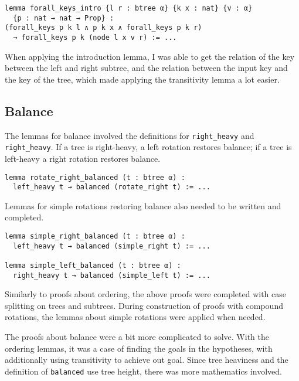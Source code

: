 \begin{lstlisting}[caption=\empty]
lemma forall_keys_intro {l r : btree α} {k x : nat} {v : α} 
  {p : nat → nat → Prop} :
(forall_keys p k l ∧ p k x ∧ forall_keys p k r) 
  → forall_keys p k (node l x v r) := ...
\end{lstlisting}

When applying the introduction lemma, I was able to get the relation of the key between the left and right subtree, and the relation between the input key and the key of the tree, which made applying the transitivity lemma a lot easier.

\subsection*{Balance}
The lemmas for balance involved the definitions for \lstinline{right_heavy} and \lstinline{right_heavy}. If a tree is right-heavy, a left rotation restores balance; if a tree is left-heavy a right rotation restores balance.

\begin{lstlisting}[caption=\empty]
lemma rotate_right_balanced (t : btree α) :
  left_heavy t → balanced (rotate_right t) := ...
\end{lstlisting}

Lemmas for simple rotations restoring balance also needed to be written and completed. 

\begin{lstlisting}[caption=\empty]
lemma simple_right_balanced (t : btree α) :
  left_heavy t → balanced (simple_right t) := ...
  
lemma simple_left_balanced (t : btree α) :
  right_heavy t → balanced (simple_left t) := ...
\end{lstlisting}

Similarly to proofs about ordering, the above proofs were completed with case splitting on trees and subtrees. During construction of proofs with compound rotations, the lemmas about simple rotations were applied when needed. 

The proofs about balance were a bit more complicated to solve. With the ordering lemmas, it was a case of finding the goals in the hypotheses, with additionally using transitivity to achieve out goal. Since tree heaviness and the definition of \lstinline{balanced} use tree height, there was more mathematics involved. 